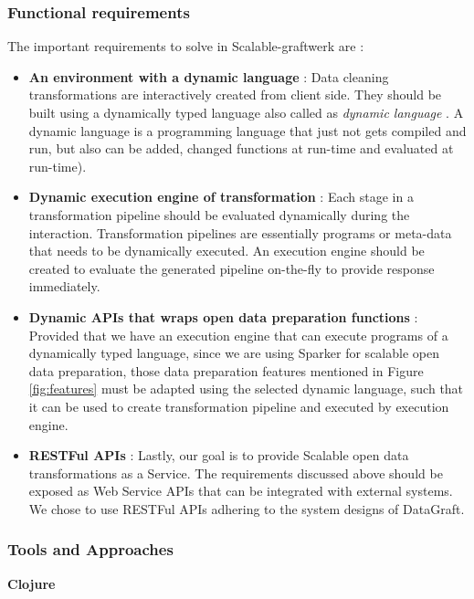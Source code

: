 \subsubsection{Functional requirements}
\label{engine-req}
The important requirements to solve in Scalable-graftwerk are :
\begin{itemize}
\item \textbf{An environment with a dynamic language} : Data cleaning transformations are interactively created from client side. They should be built using a dynamically typed language also called as \textit{dynamic language }. A dynamic language is a programming language that just not gets compiled and run, but also can be added, changed functions at run-time and evaluated at run-time). 
\item \textbf{Dynamic execution engine of transformation} :  Each stage in a transformation pipeline should be evaluated dynamically during the interaction. Transformation pipelines are essentially programs or meta-data that needs to be dynamically executed. An execution engine should be created to evaluate the generated pipeline on-the-fly to provide response immediately.
\item \textbf{Dynamic APIs that wraps open data preparation functions} : Provided that we have an execution engine that can execute programs of a dynamically typed language, since we are using Sparker for scalable open data preparation, those data preparation features mentioned in Figure \ref{fig:features} must be adapted using the selected dynamic language, such that it can be used to create  transformation pipeline and executed by execution engine.
\item \textbf{RESTFul APIs} :  Lastly, our goal is to provide Scalable open data transformations as a Service. The requirements discussed above should be exposed as Web Service APIs that can be integrated with external systems. We chose to use RESTFul APIs adhering to the system designs of DataGraft. 
\end{itemize}
\subsubsection{Tools and Approaches}

\textbf{Clojure}

